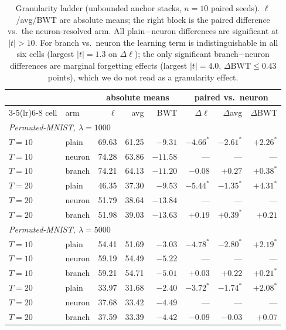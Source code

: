 \documentclass[10pt]{article}
\begin{document}
\begin{table}[t]
\centering\footnotesize\setlength{\tabcolsep}{4.5pt}
\caption{Granularity ladder (unbounded anchor stacks, $n{=}10$ paired
seeds). $\ell$/avg/BWT are absolute means; the right block is the paired
difference vs.\ the neuron-resolved arm. All plain$-$neuron differences are
significant at $|t|>10$. For branch vs.\ neuron the learning term is
indistinguishable in all six cells (largest $|t| = 1.3$ on $\Delta\ell$);
the only significant branch$-$neuron differences are marginal forgetting
effects (largest $|t| = 4.0$, $\Delta\mathrm{BWT} \le 0.43$ points), which
we do not read as a granularity effect.}
\label{tab:gran}
\begin{tabular}{llrrrr rr}
\toprule
 & & \multicolumn{3}{c}{absolute means} & \multicolumn{3}{c}{paired vs.\ neuron} \\
\cmidrule(lr){3-5}\cmidrule(lr){6-8}
cell & arm & $\ell$ & avg & BWT & $\Delta\ell$ & $\Delta$avg & $\Delta$BWT \\
\midrule
\multicolumn{8}{l}{\emph{Permuted-MNIST, $\lambda{=}1000$}}\\
$T{=}10$ & plain  & 69.63 & 61.25 & $-9.31$ & $-4.66^{*}$ & $-2.61^{*}$ & $+2.26^{*}$ \\
$T{=}10$ & neuron & 74.28 & 63.86 & $-11.58$ & --- & --- & --- \\
$T{=}10$ & branch & 74.21 & 64.13 & $-11.20$ & $-0.08$ & $+0.27$ & $+0.38^{*}$ \\
$T{=}20$ & plain  & 46.35 & 37.30 & $-9.53$ & $-5.44^{*}$ & $-1.35^{*}$ & $+4.31^{*}$ \\
$T{=}20$ & neuron & 51.79 & 38.64 & $-13.84$ & --- & --- & --- \\
$T{=}20$ & branch & 51.98 & 39.03 & $-13.63$ & $+0.19$ & $+0.39^{*}$ & $+0.21$ \\
\midrule
\multicolumn{8}{l}{\emph{Permuted-MNIST, $\lambda{=}5000$}}\\
$T{=}10$ & plain  & 54.41 & 51.69 & $-3.03$ & $-4.78^{*}$ & $-2.80^{*}$ & $+2.19^{*}$ \\
$T{=}10$ & neuron & 59.19 & 54.49 & $-5.22$ & --- & --- & --- \\
$T{=}10$ & branch & 59.21 & 54.71 & $-5.01$ & $+0.03$ & $+0.22$ & $+0.21^{*}$ \\
$T{=}20$ & plain  & 33.97 & 31.68 & $-2.40$ & $-3.72^{*}$ & $-1.74^{*}$ & $+2.08^{*}$ \\
$T{=}20$ & neuron & 37.68 & 33.42 & $-4.49$ & --- & --- & --- \\
$T{=}20$ & branch & 37.59 & 33.39 & $-4.42$ & $-0.09$ & $-0.03$ & $+0.07$ \\

\end{tabular}
\end{table}
\end{document}
